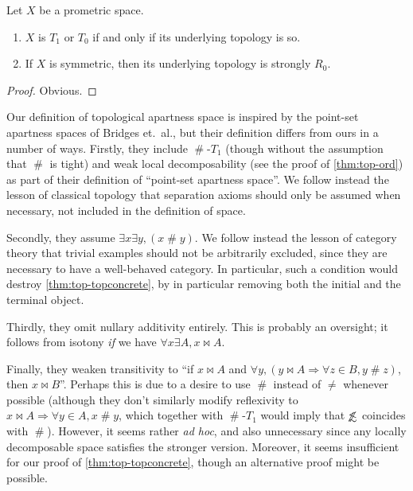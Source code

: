 \documentclass{article}
\def\apart{\mathrel{\#}}
\def\oapt{\mathrel{\!\not\,\not\lesssim}}
\let\implies\Rightarrow
\begin{document}
\begin{thm}
  Let $X$ be a prometric space.
  \begin{enumerate}
  \item $X$ is $T_1$ or $T_0$ if and only if its underlying topology is so.
  \item If $X$ is symmetric, then its underlying topology is strongly $R_0$.
  \end{enumerate}
\end{thm}
\begin{proof}
  Obvious.
\end{proof}

\begin{rmk}
  Our definition of topological apartness space is inspired by the point-set apartness spaces of Bridges et.~al., but their definition differs from ours in a number of ways.
  Firstly, they include $\apart$-$T_1$ (though without the assumption that $\apart$ is tight) and weak local decomposability (see the proof of \cref{thm:top-ord}) as part of their definition of ``point-set apartness space''.
  We follow instead the lesson of classical topology that separation axioms should only be assumed when necessary, not included in the definition of space.
  
  Secondly, they assume $\exists x \exists y,(x\apart y)$.
  We follow instead the lesson of category theory that trivial examples should not be arbitrarily excluded, since they are necessary to have a well-behaved category.
  In particular, such a condition would destroy \cref{thm:top-topconcrete}, by in particular removing both the initial and the terminal object.

  Thirdly, they omit nullary additivity entirely.
  This is probably an oversight; it follows from isotony \emph{if} we have $\forall x \exists A, x\bowtie A$.

  Finally, they weaken transitivity to ``if $x\bowtie A$ and $\forall y, (y\bowtie A \implies \forall z\in B, y\apart z)$, then $x\bowtie B$''.
  Perhaps this is due to a desire to use $\apart$ instead of $\neq$ whenever possible (although they don't similarly modify reflexivity to $x\bowtie A \implies \forall y\in A, x\apart y$, which together with $\apart$-$T_1$ would imply that $\oapt$ coincides with $\apart$).
  However, it seems rather \emph{ad hoc}, and also unnecessary since any locally decomposable space satisfies the stronger version.
  Moreover, it seems insufficient for our proof of \cref{thm:top-topconcrete}, though an alternative proof might be possible.
\end{rmk}
\end{document}
